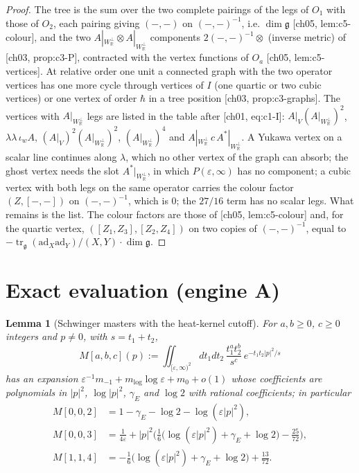 \documentclass[11pt]{article}
\theoremstyle{plain}
\newtheorem{lemma}[theorem]{Lemma}
\theoremstyle{definition}
\numberwithin{equation}{section}
\newcommand{\Wp}{W_{\mathbb R}^\perp}
\begin{document}
\begin{proof}
The tree is the sum over the two complete pairings of the legs of $O_1$ with those of $O_2$, each pairing giving $(-,-)$ on $(-,-)^{-1}$, i.e. $\dim\mathfrak g$ [ch05, lem:c5-colour], and the two $A|_{\Wp}\otimes A|_{\Wp}$ components $2(-,-)^{-1}\otimes$ (inverse metric) of [ch03, prop:c3-P], contracted with the vertex functions of $O_a$ [ch05, lem:c5-vertices]. At relative order one unit a connected graph with the two operator vertices has one more cycle through vertices of $I$ (one quartic or two cubic vertices) or one vertex of order $\hbar$ in a tree position [ch03, prop:c3-graphs]. The vertices with $A|_{\Wp}$ legs are listed in the table after [ch01, eq:c1-I]: $A|_V(A|_{\Wp})^2$, $\lambda\lambda\,\iota_wA$, $(A|_V)^2(A|_{\Wp})^2$, $(A|_{\Wp})^4$ and $A|_{\Wp}\,c\,A^*|_{\Wp}$. A Yukawa vertex on a scalar line continues along $\lambda$, which no other vertex of the graph can absorb; the ghost vertex needs the slot $A^*|_{\Wp}$, in which $P(\varepsilon,\infty)$ has no component; a cubic vertex with both legs on the same operator carries the colour factor $(Z,[-,-])$ on $(-,-)^{-1}$, which is $0$; the $27/16$ term has no scalar legs. What remains is the list. The colour factors are those of [ch05, lem:c5-colour] and, for the quartic vertex, $([Z_1,Z_3],[Z_2,Z_4])$ on two copies of $(-,-)^{-1}$, equal to $-\operatorname{tr}_{\mathfrak g}(\mathrm{ad}_{X}\mathrm{ad}_{Y})/(X,Y)\cdot\dim\mathfrak g$.
\end{proof}

\section{Exact evaluation (engine A)}

\begin{lemma}[Schwinger masters with the heat-kernel cutoff]
\label{lem:masters}
For $a,b\ge0$, $c\ge0$ integers and $p\ne0$, with $s=t_1+t_2$,
\[
M[a,b,c](p):=\iint_{[\varepsilon,\infty)^2}dt_1dt_2\,\frac{t_1^at_2^b}{s^c}\,e^{-t_1t_2|p|^2/s}
\]
has an expansion $\varepsilon^{-1}m_{-1}+m_{\log}\log\varepsilon+m_0+o(1)$ whose coefficients are polynomials in $|p|^2$, $\log|p|^2$, $\gamma_E$ and $\log2$ with rational coefficients; in particular
\[
\begin{aligned}
M[0,0,2]&=1-\gamma_E-\log2-\log(\varepsilon|p|^2),\\
M[0,0,3]&=\tfrac1{4\varepsilon}+|p|^2\Big(\tfrac16\big(\log(\varepsilon|p|^2)+\gamma_E+\log2\big)-\tfrac{25}{72}\Big),\\
M[1,1,4]&=-\tfrac16\big(\log(\varepsilon|p|^2)+\gamma_E+\log2\big)+\tfrac{13}{72}.
\end{aligned}
\]
\end{lemma}
\end{document}
